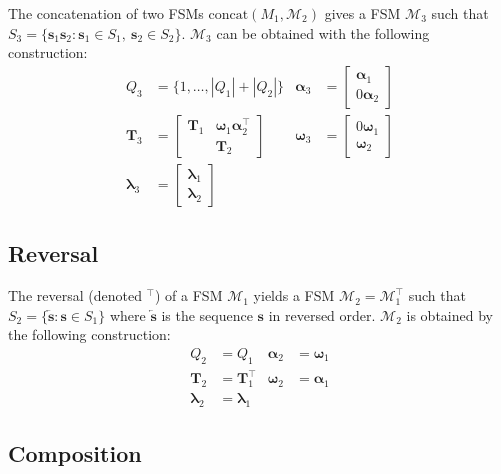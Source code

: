 The concatenation of two FSMs $\text{concat}({M}_1, \mathcal{M}_2)$
gives a FSM $\mathcal{M}_3$ such that $S_3 = \{ \mathbf{s}_1 \mathbf{s}_2 :
\mathbf{s}_1 \in S_1, \ \mathbf{s}_2 \in S_2 \}$. $\mathcal{M}_3$
can be obtained with the following construction:
\begin{align}
    Q_3 &= \{1, \dots, |Q_1| + |Q_2| \} &
    \boldsymbol{\alpha}_3 &= \begin{bmatrix}
        \boldsymbol{\alpha}_1 \\
        0 \boldsymbol{\alpha}_2
    \end{bmatrix} \\
    \mathbf{T}_3 &= \begin{bmatrix}
        \mathbf{T}_1 & \boldsymbol{\omega}_1 \boldsymbol{\alpha}_2^\top \\
        & \mathbf{T}_2
    \end{bmatrix} &
    \boldsymbol{\omega}_3 &= \begin{bmatrix}
        0 \boldsymbol{\omega}_1 \\
        \boldsymbol{\omega}_2
    \end{bmatrix} \\
    \boldsymbol{\lambda}_3 &= \begin{bmatrix}
        \boldsymbol{\lambda}_1 \\
        \boldsymbol{\lambda}_2
    \end{bmatrix} & &
\end{align}

\subsection{Reversal}

The reversal (denoted $^\top$) of a FSM $\mathcal{M}_1$ yields a FSM
$\mathcal{M}_2 = \mathcal{M}_1^\top$ such that $S_2 = \{ \overleftarrow{\mathbf{s}} :
\mathbf{s} \in S_1 \}$ where $\overleftarrow{\mathbf{s}}$ is the sequence
$\mathbf{s}$ in reversed order. $\mathcal{M}_2$ is obtained by the
following construction:
\begin{align}
    Q_2 &= Q_1 &
    \boldsymbol{\alpha}_2 &= \boldsymbol{\omega}_1 \\
    \mathbf{T}_2 &= \mathbf{T}_1^\top &
    \boldsymbol{\omega}_2 &= \boldsymbol{\alpha}_1 \\
        \boldsymbol{\lambda}_2 &= \boldsymbol{\lambda}_1 & &
\end{align}

\subsection{Composition}

